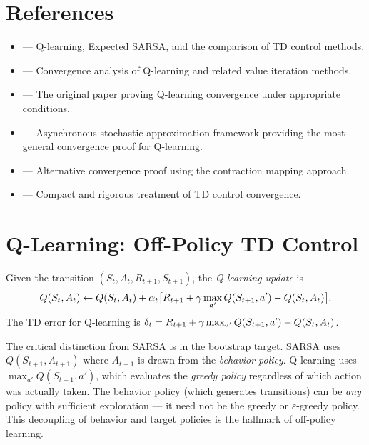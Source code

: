 \documentclass[11pt,a4paper]{article}
\begin{document}
\section{References}
\label{sec:references}

\begin{itemize}[leftmargin=2em]
  \item \citet[Chapter 6, Sections 6.5--6.7]{suttonbarto2018} ---
    Q-learning, Expected SARSA, and the comparison of TD control
    methods.
  \item \citet[Chapter 6]{bertsekas1996} --- Convergence analysis of
    Q-learning and related value iteration methods.
  \item \citet{watkins1992} --- The original paper proving Q-learning
    convergence under appropriate conditions.
  \item \citet{tsitsiklis1994} --- Asynchronous stochastic
    approximation framework providing the most general convergence
    proof for Q-learning.
  \item \citet{jaakkola1994} --- Alternative convergence proof using
    the contraction mapping approach.
  \item \citet[Section 4]{szepesvari2010} --- Compact and rigorous
    treatment of TD control convergence.
\end{itemize}

\section{Q-Learning: Off-Policy TD Control}
\label{sec:qlearning}

\begin{definition}
\label{def:qlearning}
Given the transition $(S_t, A_t, R_{t+1}, S_{t+1})$, the
\emph{Q-learning update} is
\begin{equation}
  Q(S_t, A_t) \leftarrow Q(S_t, A_t)
  + \alpha_t \bigl[R_{t+1} + \gamma \max_{a'} Q(S_{t+1}, a')
  - Q(S_t, A_t)\bigr].
  \label{eq:qlearning}
\end{equation}
The TD error for Q-learning is
$\delta_t = R_{t+1} + \gamma \max_{a'} Q(S_{t+1}, a')
- Q(S_t, A_t)$.
\end{definition}

\begin{remark}
\label{rem:off_policy}
The critical distinction from SARSA is in the bootstrap target.
SARSA uses $Q(S_{t+1}, A_{t+1})$ where $A_{t+1}$ is drawn from the
\emph{behavior policy}. Q-learning uses $\max_{a'} Q(S_{t+1}, a')$,
which evaluates the \emph{greedy policy} regardless of which action
was actually taken. The behavior policy (which generates transitions)
can be \emph{any} policy with sufficient exploration --- it need not
be the greedy or $\varepsilon$-greedy policy. This decoupling of
behavior and target policies is the hallmark of off-policy learning.
\end{remark}
\end{document}
